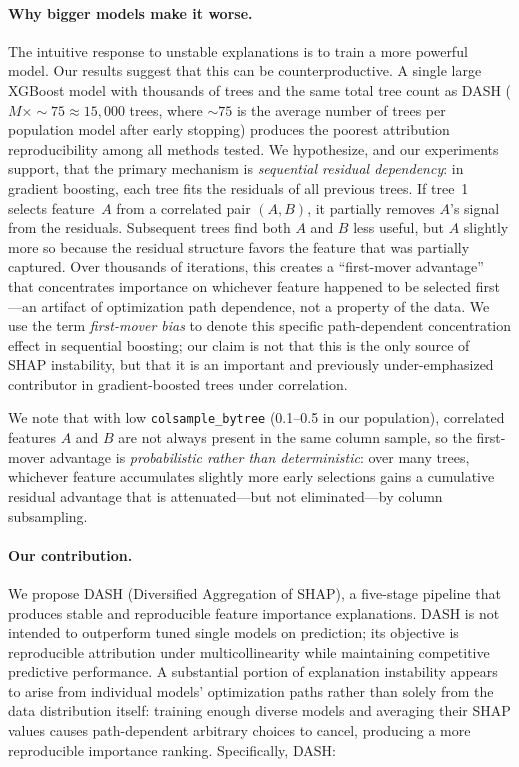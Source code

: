 \documentclass[11pt]{article}
\newcommand{\dash}{\textsc{DASH}}
\begin{document}
\paragraph{Why bigger models make it worse.}
The intuitive response to unstable explanations is to train a more powerful
model. Our results suggest that this can be counterproductive. A single large
XGBoost model with thousands of trees and the same total tree count as \dash{} ($M \times {\sim}75 \approx 15{,}000$ trees, where ${\sim}75$ is the average number of trees per population model after early stopping) produces the poorest attribution reproducibility among all methods
tested. We hypothesize, and our experiments support, that
the primary mechanism is \emph{sequential residual dependency}: in gradient boosting,
each tree fits the residuals of all previous trees. If tree~1 selects
feature~$A$ from a correlated pair $(A, B)$, it partially removes $A$'s
signal from the residuals. Subsequent trees find both $A$ and $B$ less
useful, but $A$ slightly more so because the residual structure favors the
feature that was partially captured. Over thousands of iterations, this
creates a ``first-mover advantage'' that concentrates importance on
whichever feature happened to be selected first---an artifact of
optimization path dependence, not a property of the data.
We use the term \emph{first-mover bias} to denote this specific
path-dependent concentration effect in sequential boosting;
our claim is not that this is the only source of SHAP instability,
but that it is an important and previously under-emphasized contributor
in gradient-boosted trees under correlation.

We note that with low \texttt{colsample\_bytree} (0.1--0.5 in our
population), correlated features $A$ and $B$ are not always present
in the same column sample, so the first-mover advantage is
\emph{probabilistic rather than deterministic}: over many trees,
whichever feature accumulates slightly more early selections gains a
cumulative residual advantage that is attenuated---but not eliminated---by
column subsampling.

\paragraph{Our contribution.}
We propose \dash{} (Diversified Aggregation of SHAP), a five-stage
pipeline that produces stable and reproducible feature importance
explanations. \dash{} is not intended to outperform tuned single models on
prediction; its objective is reproducible attribution under multicollinearity
while maintaining competitive predictive performance. A substantial portion of explanation instability appears to arise from
individual models' optimization paths rather than solely from the data
distribution itself: training enough diverse models and averaging their
SHAP values causes path-dependent arbitrary choices to cancel,
producing a more reproducible importance ranking. Specifically, \dash{}:
\end{document}
